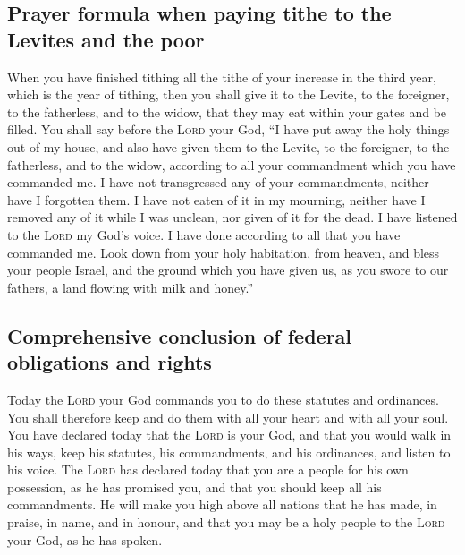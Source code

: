 \hypertarget{prayer-formula-when-paying-tithe-to-the-levites-and-the-poor}{%
\subsection{Prayer formula when paying tithe to the Levites and the
poor}\label{prayer-formula-when-paying-tithe-to-the-levites-and-the-poor}}

 When you have finished tithing all the tithe of your
increase in the third year, which is the year of tithing, then you shall
give it to the Levite, to the foreigner, to the fatherless, and to the
widow, that they may eat within your gates and be filled.
 You shall say before the \textsc{Lord} your God, ``I
have put away the holy things out of my house, and also have given them
to the Levite, to the foreigner, to the fatherless, and to the widow,
according to all your commandment which you have commanded me. I have
not transgressed any of your commandments, neither have I forgotten
them.  I have not eaten of it in my mourning, neither
have I removed any of it while I was unclean, nor given of it for the
dead. I have listened to the \textsc{Lord} my God's voice. I have done
according to all that you have commanded me.  Look down
from your holy habitation, from heaven, and bless your people Israel,
and the ground which you have given us, as you swore to our fathers, a
land flowing with milk and honey.''

\hypertarget{comprehensive-conclusion-of-federal-obligations-and-rights}{%
\subsection{Comprehensive conclusion of federal obligations and
rights}\label{comprehensive-conclusion-of-federal-obligations-and-rights}}

 Today the \textsc{Lord} your God commands you to do
these statutes and ordinances. You shall therefore keep and do them with
all your heart and with all your soul.  You have declared
today that the \textsc{Lord} is your God, and that you would walk in his
ways, keep his statutes, his commandments, and his ordinances, and
listen to his voice.  The \textsc{Lord} has declared
today that you are a people for his own possession, as he has promised
you, and that you should keep all his commandments.  He
will make you high above all nations that he has made, in praise, in
name, and in honour, and that you may be a holy people to the
\textsc{Lord} your God, as he has spoken.

